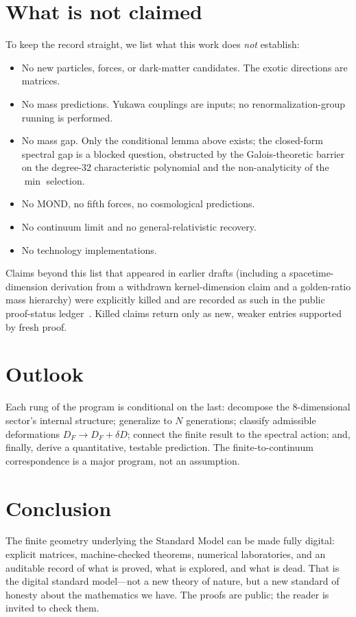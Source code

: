 \documentclass[aps,prd,twocolumn,superscriptaddress,showpacs]{revtex4-2}
\begin{document}
\section{What is not claimed}
\label{sec:not}

To keep the record straight, we list what this work does
\emph{not} establish:
\begin{itemize}
\item No new particles, forces, or dark-matter candidates. The
exotic directions are matrices.
\item No mass predictions. Yukawa couplings are inputs; no
renormalization-group running is performed.
\item No mass gap. Only the conditional lemma above exists;
the closed-form spectral gap is a blocked question, obstructed
by the Galois-theoretic barrier on the degree-32 characteristic
polynomial and the non-analyticity of the $\min$ selection.
\item No MOND, no fifth forces, no cosmological predictions.
\item No continuum limit and no general-relativistic recovery.
\item No technology implementations.
\end{itemize}
Claims beyond this list that appeared in earlier drafts
(including a spacetime-dimension derivation from a withdrawn
kernel-dimension claim and a golden-ratio mass hierarchy) were
explicitly killed and are recorded as such in the public
proof-status ledger~\cite{thetlogos}. Killed claims return
only as new, weaker entries supported by fresh proof.

\section{Outlook}

Each rung of the program is conditional on the last:
decompose the 8-dimensional sector's internal structure;
generalize to $N$ generations; classify admissible deformations
$D_F \to D_F + \delta D$; connect the finite result to the
spectral action; and, finally, derive a quantitative, testable
prediction. The finite-to-continuum correspondence is a major
program, not an assumption.

\section{Conclusion}

The finite geometry underlying the Standard Model can be made
fully digital: explicit matrices, machine-checked theorems,
numerical laboratories, and an auditable record of what is
proved, what is explored, and what is dead. That is the
digital standard model---not a new theory of nature, but a new
standard of honesty about the mathematics we have. The proofs
are public; the reader is invited to check them.
\end{document}
